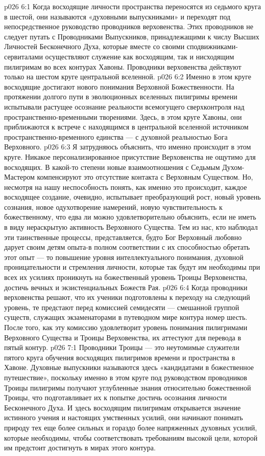 \vs p026 6:1 Когда восходящие личности пространства переносятся из седьмого круга в шестой, они называются «духовными выпускниками» и переходят под непосредственное руководство проводников верховенства. Этих проводников не следует путать с Проводниками Выпускников, принадлежащими к числу Высших Личностей Бесконечного Духа, которые вместе со своими сподвижниками\hyp{}сервиталами осуществляют служение как восходящим, так и нисходящим пилигримам во всех контурах Хавоны. Проводники верховенства действуют только на шестом круге центральной вселенной.
\vs p026 6:2 Именно в этом круге восходящие достигают нового понимания Верховной Божественности. На протяжении долгого пути в эволюционных вселенных пилигримы времени испытывали растущее осознание реальности всемогущего сверхконтроля над пространственно\hyp{}временными творениями. Здесь, в этом круге Хавоны, они приближаются к встрече с находящимся в центральной вселенной источником пространственно\hyp{}временного единства --- с духовной реальностью Бога Верховного.
\vs p026 6:3 Я затрудняюсь объяснить, что именно происходит в этом круге. Никакое персонализированное присутствие Верховенства не ощутимо для восходящих. В какой\hyp{}то степени новые взаимоотношения с Седьмым Духом\hyp{}Мастером компенсируют это отсутствие контакта с Верховным Существом. Но, несмотря на нашу неспособность понять, как именно это происходит, каждое восходящее создание, очевидно, испытывает преобразующий рост, новый уровень сознания, новое одухотворение намерений, новую чувствительность к божественному, что едва ли можно удовлетворительно объяснить, если не иметь в виду нераскрытую активность Верховного Существа. Тем из нас, кто наблюдал эти таинственные процессы, представляется, будто Бог Верховный любовно дарует своим детям опыта\hyp{}в полном соответствии с их способностью обретать этот опыт --- то повышение уровня интеллектуального понимания, духовной проницательности и стремления личности, которые так будут им необходимы при всех их усилиях проникнуть на божественный уровень Троицы Верховенства, достичь вечных и экзистенциальных Божеств Рая.
\vs p026 6:4 Когда проводники верховенства решают, что их ученики подготовлены к переходу на следующий уровень, те предстают перед комиссией семидесяти --- смешанной группой существ, служащих экзаменаторами в путеводном мире контура номер шесть. После того, как эту комиссию удовлетворит уровень понимания пилигримами Верховного Существа и Троицы Верховенства, их аттестуют для перевода в пятый контур.
\vs p026 7:1 Проводники Троицы --- это неутомимые служители пятого круга обучения восходящих пилигримов времени и пространства в Хавоне. Духовные выпускники называются здесь «кандидатами в божественное путешествие», поскольку именно в этом круге под руководством проводников Троицы пилигримы получают углубленные знания относительно божественной Троицы, что подготавливает их к попытке достичь осознания личности Бесконечного Духа. И здесь восходящим пилигримам открывается значение истинного учения и настоящих умственных усилий, они начинают понимать природу тех еще более сильных и гораздо более напряженных духовных усилий, которые необходимы, чтобы соответствовать требованиям высокой цели, которой им предстоит достигнуть в мирах этого контура.

